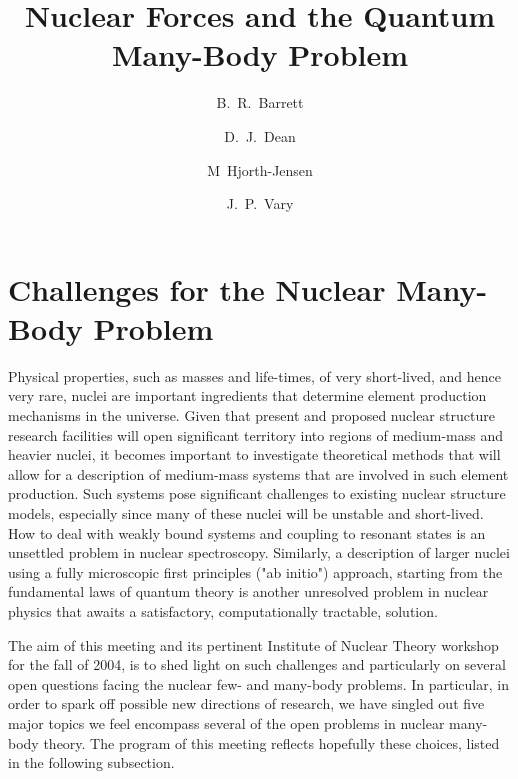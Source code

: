 \documentclass[12pt]{iopart}
\begin{document}
\title{Nuclear Forces and the Quantum Many-Body Problem} 


\author{B.~R.~Barrett}
\address{Department of Physics, University of Arizona, Tucson, Arizona 85721, USA}


\author{D.~J.~Dean}
\address{Physics Division, Oak Ridge National Laboratory,
P.O. Box 2008, Oak Ridge, TN 37831-6373, USA\\
Center of Mathematics for Applications, 
University of Oslo,
N-0316 Oslo, Norway}


\author{M~Hjorth-Jensen}
\address{Department of Physics and Center of Mathematics for Applications, 
University of Oslo,
N-0316 Oslo, Norway}

\author{J.~P.~Vary}
\address{Department of Physics and Astronomy, Iowa State University, Ames, Iowa 50011, USA}


\maketitle
 
\section{Challenges for the Nuclear Many-Body Problem} 

Physical properties, such as masses and life-times,
of very short-lived, and hence very rare, nuclei are important
ingredients that determine element production mechanisms in
the universe. Given that present and proposed nuclear structure research facilities
will open significant
territory into regions of medium-mass and heavier nuclei,
it becomes important to investigate theoretical methods that will allow
for a description of medium-mass systems that are involved in such
element production. Such systems pose significant
challenges to existing nuclear structure models, especially since many of
these nuclei will be unstable and short-lived. How to deal with weakly
bound systems and coupling to resonant states is an unsettled problem in
nuclear spectroscopy. Similarly,  a description of  larger nuclei using a
fully microscopic first principles ("ab initio") approach, starting from the
fundamental laws of quantum theory is another unresolved problem
in nuclear physics that awaits a satisfactory, computationally tractable,
solution.

The aim of this meeting and its pertinent Institute of Nuclear 
Theory workshop for the fall of 2004, is to shed light  
on such challenges and particularly 
on several open questions facing the 
nuclear few- and many-body problems. In particular, in order to spark off possible 
new directions of research, we have singled out five major topics we feel encompass
several of the open problems in nuclear many-body theory. The program of this meeting 
reflects hopefully these choices, listed in the following subsection.
\end{document}
